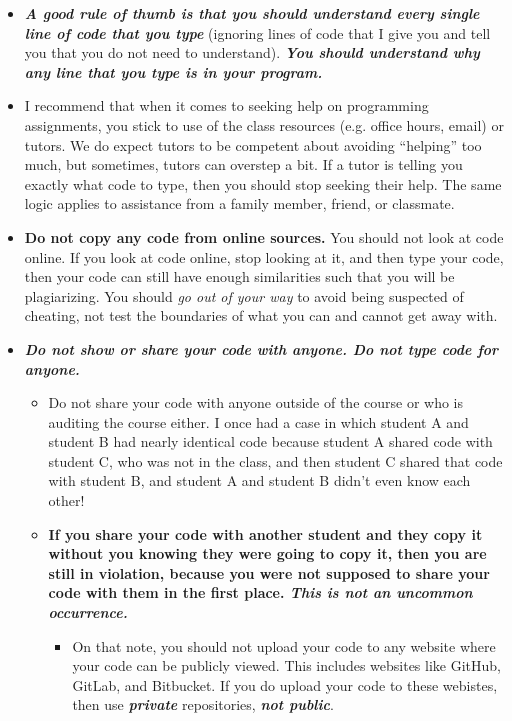\documentclass{article}
\begin{document}
\begin{itemize}[itemsep=0mm, parsep=0pt]
\item \textit{\textbf{A good rule of thumb is that you should understand every single line of code that you type}} (ignoring lines of code that I give you and tell you that you do not need to understand). \textit{\textbf{You should understand why any line that you type is in your program.}}
\item I recommend that when it comes to seeking help on programming assignments, you stick to use of the class resources (e.g. office hours, email) or tutors. We do expect tutors to be competent about avoiding ``helping'' too much, but sometimes, tutors can overstep a bit. If a tutor is telling you exactly what code to type, then you should stop seeking their help. The same logic applies to assistance from a family member, friend, or classmate.
\item \textbf{Do not copy any code from online sources.} You should not look at code online. If you look at code online, stop looking at it, and then type your code, then your code can still have enough similarities such that you will be plagiarizing. You should \textit{go out of your way} to avoid being suspected of cheating, not test the boundaries of what you can and cannot get away with.
\item \textbf{\textit{Do not show or share your code with anyone. Do not type code for anyone.}}
    \begin{itemize}[itemsep=0mm, parsep=0pt]
    \item Do not share your code with anyone outside of the course or who is auditing the course either. I once had a case in which student A and student B had nearly identical code because student A shared code with student C, who was not in the class, and then student C shared that code with student B, and student A and student B didn't even know each other!
    \item \textbf{If you share your code with another student and they copy it without you knowing they were going to copy it, then you are still in violation, because you were not supposed to share your code with them in the first place. \textit{This is not an uncommon occurrence.}}
        \begin{itemize}[itemsep=0mm, parsep=0pt]
        \item On that note, you should not upload your code to any website where your code can be publicly viewed. This includes websites like GitHub, GitLab, and Bitbucket. If you do upload your code to these webistes, then use \textbf{\textit{private}} repositories, \textbf{\textit{not public}}.

\end{itemize}
\end{itemize}
\end{itemize}
\end{document}
